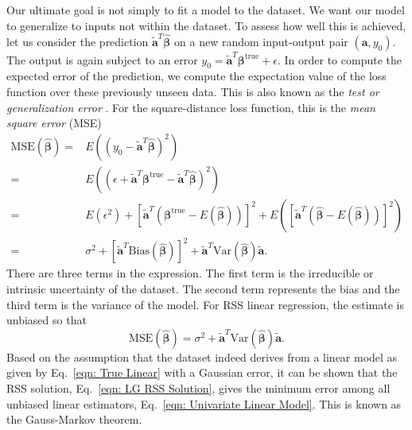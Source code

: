 Our ultimate goal is not simply to fit a model to the dataset. We want our model to generalize to inputs not within the dataset. To assess how well this is achieved, let us consider the prediction $\tilde{\bm{a}}^{T} \hat{\bm{\beta}}$  on a new random input-output pair $(\bm{a},y_{0})$. The output is again subject to an error $y_{0} = \tilde{\bm{a}}^{T}\bm{\beta}^{\textrm{true}} + \epsilon$. 
In order to compute the expected error of the prediction, we  compute the expectation value of the loss function over these previously unseen data. This is also known as the \emph{test or generalization error}
. For the square-distance loss function, this is the \emph{mean square error} (MSE)
\begin{equation}\label{eqn: MSE Generalisation Error}
    \begin{split}
        \textrm{MSE}(\hat{\bm{\beta}}) =&E\left((y_{0} - \tilde{\bm{a}}^{T} \hat{\bm{\beta}})^2\right) \\
        = &E\left((\epsilon + \tilde{\bm{a}}^{T}\bm{\beta}^{\textrm{true}} - \tilde{\bm{a}}^{T}\hat{\bm{\beta}})^2\right) \\
        = &E(\epsilon^2) +  [\tilde{\bm{a}}^{T}(\bm{\beta}^{\textrm{true}} - E(\hat{\bm{\beta}}))]^2 + E\left( [\tilde{\bm{a}}^{T}(\hat{\bm{\beta}} - E(\hat{\bm{\beta}}))]^2\right) \\
        = &\sigma^2 + [\tilde{\bm{a}}^{T}\textrm{Bias}(\hat{\bm{\beta}})]^2 + \tilde{\bm{a}}^{T} \textrm{Var}(\hat{\bm{\beta}}) \tilde{\bm{a}}.
    \end{split}
\end{equation}
There are three terms in the expression. The first term is the irreducible or intrinsic uncertainty of the dataset. The second term represents the bias and the third term is the variance of the model. For RSS linear regression, the estimate is unbiased so that
\begin{equation}
        \textrm{MSE}(\hat{\bm{\beta}}) = \sigma^2 + \tilde{\bm{a}}^{T} \textrm{Var}(\hat{\bm{\beta}}) \tilde{\bm{a}}.
\end{equation}
Based on the assumption that the dataset indeed derives from a linear model as given by Eq.~\eqref{eqn: True Linear} with a Gaussian error, it can be shown that the RSS solution, Eq.~\eqref{eqn: LG RSS Solution}, gives the minimum error among all unbiased linear estimators, Eq.~\eqref{eqn: Univariate Linear Model}.
This is known as the Gauss-Markov theorem.


